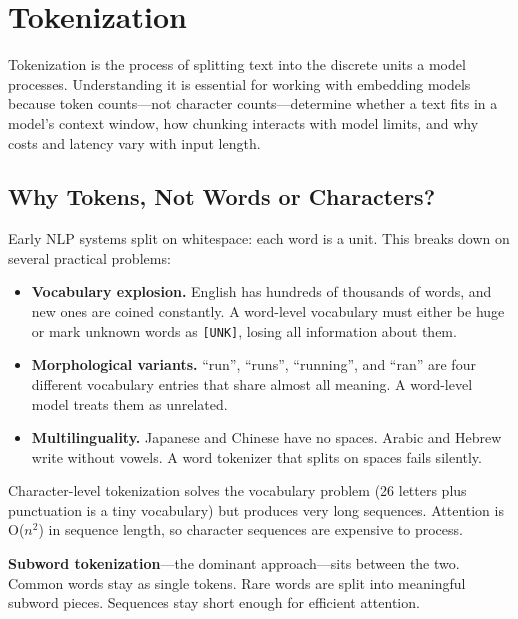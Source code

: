 \chapter{Tokenization}
\label{ch:tokenization}

Tokenization is the process of splitting text into the discrete units a model processes.
Understanding it is essential for working with embedding models because token counts---not
character counts---determine whether a text fits in a model's context window, how chunking
interacts with model limits, and why costs and latency vary with input length.

\section{Why Tokens, Not Words or Characters?}

Early NLP systems split on whitespace: each word is a unit. This breaks down on several
practical problems:

\begin{itemize}
    \item \textbf{Vocabulary explosion.} English has hundreds of thousands of words, and new
          ones are coined constantly. A word-level vocabulary must either be huge or mark
          unknown words as \texttt{[UNK]}, losing all information about them.
    \item \textbf{Morphological variants.} ``run'', ``runs'', ``running'', and ``ran'' are four
          different vocabulary entries that share almost all meaning. A word-level model treats
          them as unrelated.
    \item \textbf{Multilinguality.} Japanese and Chinese have no spaces. Arabic and Hebrew write
          without vowels. A word tokenizer that splits on spaces fails silently.
\end{itemize}

Character-level tokenization solves the vocabulary problem (26 letters plus punctuation is a
tiny vocabulary) but produces very long sequences. Attention is O($n^2$) in sequence length,
so character sequences are expensive to process.

\textbf{Subword tokenization}---the dominant approach---sits between the two. Common words stay
as single tokens. Rare words are split into meaningful subword pieces. Sequences stay short
enough for efficient attention.

